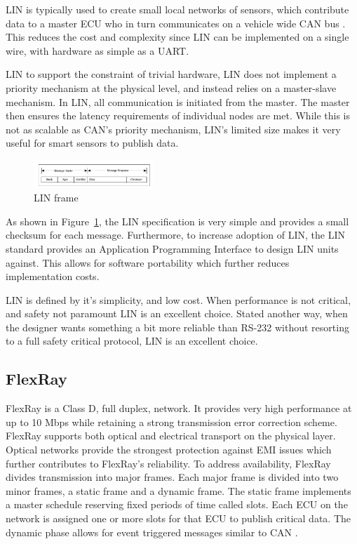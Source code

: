 \documentclass[conference,12pt]{IEEEtran}
\begin{document}
LIN is typically used to create small local networks of sensors, which
contribute data to a master ECU who in turn communicates on a vehicle wide CAN
bus \autocite{lukasiewycz_system_2013}.  This reduces the cost and complexity
since LIN can be implemented on a single wire, with hardware as simple as
a UART.  

LIN to support the constraint of trivial hardware, LIN does not implement
a priority mechanism at the physical level, and instead relies on a master-slave
mechanism. In LIN, all communication is initiated from the master. The master then
ensures the latency requirements of individual nodes are met. While this is
not as scalable as CAN's priority mechanism, LIN's limited size makes it very
useful for smart sensors to publish data.

\begin{figure}
  \centering
  \includegraphics[width=0.4\textwidth]{LIN_frame.png}
  \caption{LIN frame}
  \label{fig:lin_frame}
\end{figure}

As shown in Figure~\ref{fig:lin_frame}, the LIN specification is very simple and
provides a small checksum for each message. Furthermore, to increase adoption of
LIN, the LIN standard provides an Application Programming Interface to design
LIN units against. This allows for software portability which further reduces
implementation costs. 

LIN is defined by it's simplicity, and low cost.  When performance is not
critical, and safety not paramount LIN is an excellent choice.  Stated another
way, when the designer wants something a bit more reliable than RS-232 without
resorting to a full safety critical protocol, LIN is
an excellent choice. 

\subsection{FlexRay}
FlexRay is a Class D, full duplex, network. It provides very high performance
at up to 10
Mbps while retaining a strong transmission error correction scheme.  FlexRay
supports both optical and electrical transport on the physical layer.  Optical
networks provide the strongest protection against EMI issues which further
contributes to FlexRay's reliability.  To
address availability, FlexRay divides transmission into major frames. Each major
frame is divided into two minor frames, a static frame and a dynamic frame. The
static frame implements a master schedule reserving fixed periods of
time called slots.  Each ECU on the network is assigned one or more slots for
that ECU to publish critical data. The dynamic phase allows for event triggered messages
similar to CAN \autocite{luo_research_2008}.  
\end{document}
